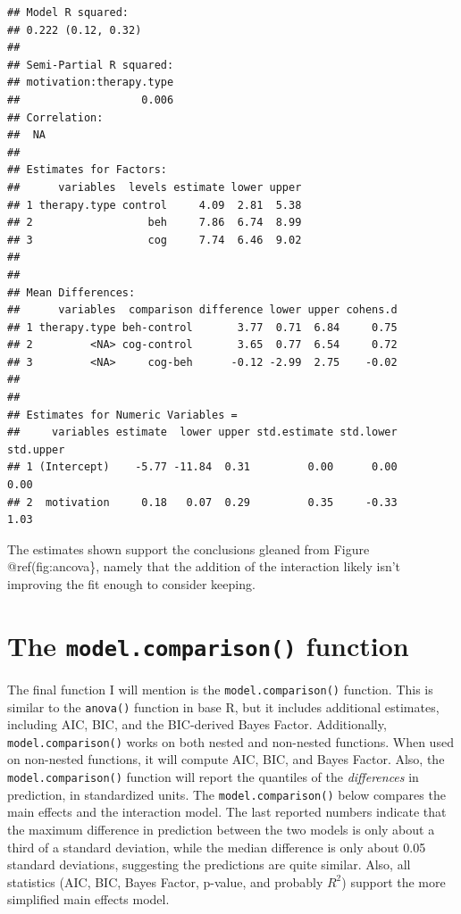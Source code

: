 \documentclass[,]{book}
\begin{document}
\begin{verbatim}
## Model R squared:
## 0.222 (0.12, 0.32)
## 
## Semi-Partial R squared:
## motivation:therapy.type 
##                   0.006 
## Correlation:
##  NA 
## 
## Estimates for Factors:
##      variables  levels estimate lower upper
## 1 therapy.type control     4.09  2.81  5.38
## 2                  beh     7.86  6.74  8.99
## 3                  cog     7.74  6.46  9.02
## 
## 
## Mean Differences:
##      variables  comparison difference lower upper cohens.d
## 1 therapy.type beh-control       3.77  0.71  6.84     0.75
## 2         <NA> cog-control       3.65  0.77  6.54     0.72
## 3         <NA>     cog-beh      -0.12 -2.99  2.75    -0.02
## 
## 
## Estimates for Numeric Variables = 
##     variables estimate  lower upper std.estimate std.lower std.upper
## 1 (Intercept)    -5.77 -11.84  0.31         0.00      0.00      0.00
## 2  motivation     0.18   0.07  0.29         0.35     -0.33      1.03
\end{verbatim}

The estimates shown support the conclusions gleaned from Figure
@ref(fig:ancova\}, namely that the addition of the interaction likely
isn't improving the fit enough to consider keeping.

\section*{\texorpdfstring{The \texttt{model.comparison()}
function}{The model.comparison() function}}\label{the-model.comparison-function}

The final function I will mention is the \texttt{model.comparison()}
function. This is similar to the \texttt{anova()} function in base R,
but it includes additional estimates, including AIC, BIC, and the
BIC-derived Bayes Factor. Additionally, \texttt{model.comparison()}
works on both nested and non-nested functions. When used on non-nested
functions, it will compute AIC, BIC, and Bayes Factor. Also, the
\texttt{model.comparison()} function will report the quantiles of the
\emph{differences} in prediction, in standardized units. The
\texttt{model.comparison()} below compares the main effects and the
interaction model. The last reported numbers indicate that the maximum
difference in prediction between the two models is only about a third of
a standard deviation, while the median difference is only about 0.05
standard deviations, suggesting the predictions are quite similar. Also,
all statistics (AIC, BIC, Bayes Factor, p-value, and probably \(R^2\))
support the more simplified main effects model.
\end{document}
